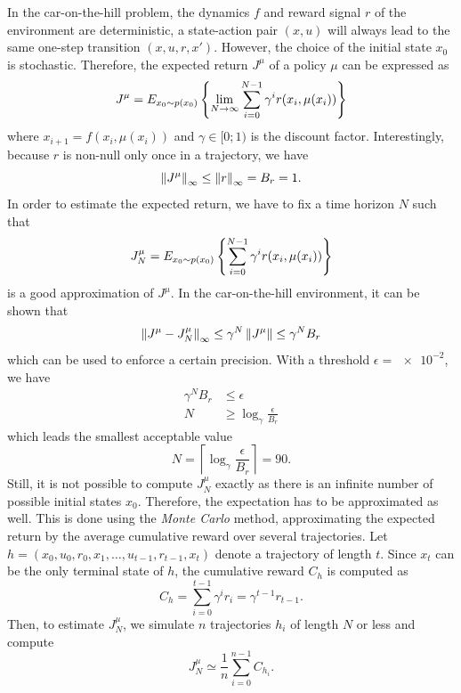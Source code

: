 \documentclass[a4paper, 12pt]{article}
\begin{document}
    In the car-on-the-hill problem, the dynamics $f$ and reward signal $r$ of the environment are deterministic, \ie{} a state-action pair $(x, u)$ will always lead to the same one-step transition $(x, u, r, x')$. However, the choice of the initial state $x_0$ is stochastic. Therefore, the expected return $J^\mu$ of a policy $\mu$ can be expressed as
    \begin{equation}
        J^\mu = E_{x_0 \sim p(x_0)} \left\{ \lim_{N \to \infty} \sum_{i = 0}^{N - 1} \gamma^i r(x_i, \mu(x_i)) \right\}
    \end{equation}
    where $x_{i + 1} = f(x_i, \mu(x_i))$ and $\gamma \in [0; 1)$ is the discount factor. Interestingly, because $r$ is non-null only once in a trajectory, we have
    \begin{equation}
        \left\|J^\mu\right\|_\infty \leq \left\|r\right\|_\infty = B_r = 1 .
    \end{equation}
    In order to estimate the expected return, we have to fix a time horizon $N$ such that
    \begin{equation}\label{eq:N-expected.return}
        J^\mu_N = E_{x_0 \sim p(x_0)} \left\{ \sum_{i = 0}^{N - 1} \gamma^i r(x_i, \mu(x_i)) \right\}
    \end{equation}
    is a good approximation of $J^\mu$. In the car-on-the-hill environment, it can be shown \cite{ernstinfo8003, rozet2021suboptimality} that
    \begin{equation}
        \left\|J^\mu - J^\mu_N\right\|_\infty \leq \gamma^N \left\|J^\mu\right\| \leq \gamma^N B_r
    \end{equation}
    which can be used to enforce a certain precision. With a threshold $\epsilon = \num{e-2}$, we have
    \begin{align*}
        \gamma^N B_r & \leq \epsilon \\
        N & \geq \log_\gamma \frac{\epsilon}{B_r}
    \end{align*}
    which leads the smallest acceptable value
    \begin{equation} \label{eq:N-smallest.acceptable}
        N = \left\lceil \log_\gamma \frac{\epsilon}{B_r} \right\rceil = 90.
    \end{equation}
    Still, it is not possible to compute $J^\mu_N$ exactly as there is an infinite number of possible initial states $x_0$. Therefore, the expectation has to be approximated as well. This is done using the \emph{Monte Carlo} method, \ie{} approximating the expected return by the average cumulative reward over several trajectories. Let $h = (x_0, u_0, r_0, x_1, \dots, u_{t - 1}, r_{t - 1}, x_t)$ denote a trajectory of length $t$. Since $x_t$ can be the only terminal state of $h$, the cumulative reward $C_h$ is computed as
    \begin{equation}
        C_h = \sum_{i = 0}^{t - 1} \gamma^i r_i = \gamma^{t - 1} r_{t - 1} .
    \end{equation}
    Then, to estimate $J^\mu_N$, we simulate $n$ trajectories $h_i$ of length $N$ or less and compute
    \begin{equation}
        J^\mu_N \simeq \frac{1}{n} \sum_{i = 0}^{n - 1} C_{h_i} .
    \end{equation}
    
    \newpage

    \printbibliography
\end{document}
